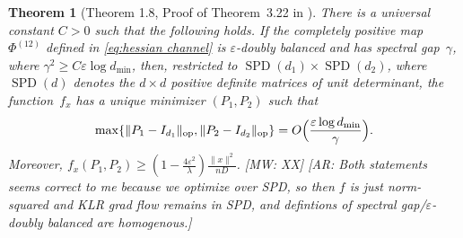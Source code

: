 \documentclass[aos]{imsart}
\newtheorem{theorem}{Theorem}[section]
\theoremstyle{definition}
\numberwithin{equation}{section}
\DeclareMathOperator{\op}{op}
\DeclareMathOperator{\SSPD}{SPD}
\DeclarePairedDelimiter{\norm}{\lVert}{\rVert}
\newcommand{\eps}{\varepsilon}
\newcommand{\AR}[1]{{\color{orange}[AR: #1]}}
\newcommand{\MW}[1]{{\color{red}[MW: #1]}}
\begin{document}
\begin{theorem}[Theorem 1.8, Proof of Theorem~3.22 in \cite{KLR19}]\label{thm:klr}
There is a universal constant $C>0$ such that the following holds.
If the completely positive map $\Phi^{(12)}$ defined in \cref{eq:hessian channel} is $\eps$-doubly balanced and has spectral gap~$\gamma$, where $\gamma^2 \geq C \eps \log d_{\min}$, then, restricted to $\SSPD(d_1) \times \SSPD(d_2)$, where $\SSPD(d)$ denotes the $d\times d$ positive definite matrices of unit determinant, the function~$f_x$ has a unique minimizer $(P_1,P_2)$ such that
\begin{align*}
  \max \{ \norm{P_1 - I_{d_1}}_{\op}, \norm{P_2 - I_{d_2}}_{\op} \} = O\Bigl(\frac{\eps \log d_{\min}}\gamma\Bigr).
\end{align*}
Moreover, $f_x(P_1, P_2) \geq (1 - \frac{4 \eps^2}{\lambda}) \frac{\|x\|^2}{nD}$. \MW{XX}
\AR{Both statements seems correct to me because we optimize over SPD, so then $f$ is just norm-squared and KLR grad flow remains in SPD, and defintions of spectral gap/$\eps$-doubly balanced are homogenous.}
\end{theorem}
\end{document}

